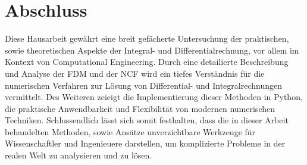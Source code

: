 \section*{Abschluss}

Diese Hausarbeit gewährt eine breit gefächerte Untersuchung der praktischen, sowie theoretischen Aspekte der Integral- und Differentialrechnung, vor allem im Kontext von Computational Engineering. Durch eine detailierte Beschreibung und Analyse der FDM und der NCF wird ein tiefes Verständnis für die numerischen Verfahren zur Lösung von Differential- und Integralrechnungen vermittelt. Des Weiteren zeieigt die Implementierung dieser Methoden in Python, die praktische Anwendbarkeit und Flexibilität von modernen numerischen Techniken. Schlussendlich lässt sich somit festhalten, dass die in dieser Arbeit behandelten Methoden, sowie Ansätze unverzichtbare Werkzeuge für Wissenschaftler und Ingenieuere darstellen, um komplizierte Probleme in der realen Welt zu analysieren und zu lösen.